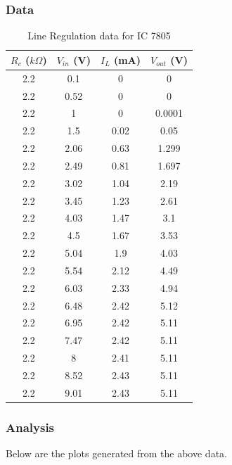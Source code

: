\documentclass[10pt]{scrartcl}
\theoremstyle{definition}
\begin{document}
\subsubsection{Data}
\begin{table}[!h]
    \centering
    \caption{Line Regulation data for IC 7805}
    \begin{tabular}{|c|c|c|c|}
    \hline
        \textbf{$R_c$ ($k\Omega$)} & \textbf{$V_{in}$ (V)} & \textbf{$I_L$ (mA)} & \textbf{$V_{out}$ (V)} \\ \hline
        2.2 & 0.1 & 0 & 0 \\ \hline
        2.2 & 0.52 & 0 & 0 \\ \hline
        2.2 & 1 & 0 & 0.0001 \\ \hline
        2.2 & 1.5 & 0.02 & 0.05 \\ \hline
        2.2 & 2.06 & 0.63 & 1.299 \\ \hline
        2.2 & 2.49 & 0.81 & 1.697 \\ \hline
        2.2 & 3.02 & 1.04 & 2.19 \\ \hline
        2.2 & 3.45 & 1.23 & 2.61 \\ \hline
        2.2 & 4.03 & 1.47 & 3.1 \\ \hline
        2.2 & 4.5 & 1.67 & 3.53 \\ \hline
        2.2 & 5.04 & 1.9 & 4.03 \\ \hline
        2.2 & 5.54 & 2.12 & 4.49 \\ \hline
        2.2 & 6.03 & 2.33 & 4.94 \\ \hline
        2.2 & 6.48 & 2.42 & 5.12 \\ \hline
        2.2 & 6.95 & 2.42 & 5.11 \\ \hline
        2.2 & 7.47 & 2.42 & 5.11 \\ \hline
        2.2 & 8 & 2.41 & 5.11 \\ \hline
        2.2 & 8.52 & 2.43 & 5.11 \\ \hline
        2.2 & 9.01 & 2.43 & 5.11 \\ \hline
    \end{tabular}
\end{table}
\subsubsection{Analysis}
Below are the plots generated from the above data.
\end{document}
